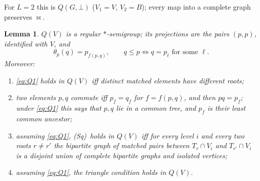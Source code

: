 \documentclass[11pt]{amsart}
\newtheorem{lemma}[theorem]{Lemma}
\theoremstyle{definition}
\newcommand{\mt}{\bowtie}      %
\newcommand{\Wire}{\textup{(Sq)}}      %
\begin{document}
For $L=2$ this is $Q(G,\bot)$ ($V_1=V$, $V_2=B$); every map into a complete graph preserves $\mt$.

\begin{lemma}\label{lem:layered}
$Q(V)$ is a regular $*$-semigroup; its projections are the pairs $(p,p)$, identified with $V$, and
\[
\theta_p(q)=p_{f(p,q)},\qquad q\le p\iff q=p_\ell\text{ for some }\ell .
\]
Moreover:
\begin{enumerate}[label=\textup{(\alph*)},nosep]
\item \eqref{eq:Q1} holds in $Q(V)$ iff distinct matched elements have different roots;
\item two elements $p,q$ commute iff $p_f=q_f$ for $f=f(p,q)$, and then $pq=p_f$; under \eqref{eq:Q1} this says that $p,q$ lie in a common tree, and $p_f$ is their least common ancestor;
\item assuming \eqref{eq:Q1}, \Wire\ holds in $Q(V)$ iff for every level $i$ and every two roots $r\ne r'$ the bipartite graph of matched pairs between $T_r\cap V_i$ and $T_{r'}\cap V_i$ is a disjoint union of complete bipartite graphs and isolated vertices;
\item assuming \eqref{eq:Q1}, the triangle condition holds in $Q(V)$.
\end{enumerate}
\end{lemma}
\end{document}
